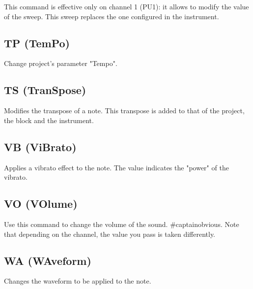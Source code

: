 This command is effective only on channel 1 (PU1): it allows to modify the value of the sweep.
This sweep replaces the one configured in the instrument.

\subsection{TP (TemPo)}

Change project's parameter "Tempo".

\subsection{TS (TranSpose)}


Modifies the transpose of a note. This transpose is added to that of the project, the block and the instrument.

\subsection{VB (ViBrato)}


Applies a vibrato effect to the note. The value indicates the "power" of the vibrato.

\subsection{VO (VOlume)}

Use this command to change the volume of the sound.
\#captainobvious.
Note that depending on the channel, the value you pass is taken differently.

\subsection{WA (WAveform)}


Changes the waveform to be applied to the note.
